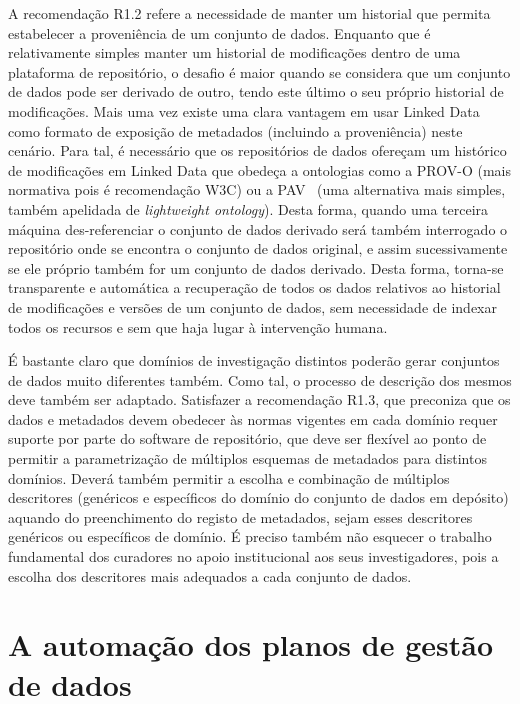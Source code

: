 \documentclass[sigconf,nonacm]{acmart}
\begin{document}
A recomendação R1.2 refere a necessidade de manter um historial que permita estabelecer a proveniência de um conjunto de dados. Enquanto que é relativamente simples manter um historial de modificações dentro de uma plataforma de repositório, o desafio é maior quando se considera que um conjunto de dados pode ser derivado de outro, tendo este último o seu próprio historial de modificações. Mais uma vez existe uma clara vantagem em usar Linked Data como formato de exposição de metadados (incluindo a proveniência) neste cenário. Para tal, é necessário que os repositórios de dados ofereçam um histórico de modificações em Linked Data que obedeça a ontologias como a PROV-O\cite{lebo2013prov} (mais normativa pois é recomendação W3C) ou a PAV~\cite{ciccarese2013pav} (uma alternativa mais simples, também apelidada de \emph{lightweight ontology}). Desta forma, quando uma terceira máquina des-referenciar o conjunto de dados derivado será também interrogado o repositório onde se encontra o conjunto de dados original, e assim sucessivamente se ele próprio também for um conjunto de dados derivado. Desta forma, torna-se transparente e automática a recuperação de todos os dados relativos ao historial de modificações e versões de um conjunto de dados, sem necessidade de indexar todos os recursos e sem que haja lugar à intervenção humana.

É bastante claro que domínios de investigação distintos poderão gerar conjuntos de dados muito diferentes também. Como tal, o processo de descrição dos mesmos deve também ser adaptado. Satisfazer a recomendação R1.3, que preconiza que os dados e metadados devem obedecer às normas vigentes em cada domínio requer suporte por parte do software de repositório, que deve ser flexível ao ponto de permitir a parametrização de múltiplos esquemas de metadados para distintos domínios. Deverá também permitir a escolha e combinação de múltiplos descritores (genéricos e específicos do domínio do conjunto de dados em depósito) aquando do preenchimento do registo de metadados, sejam esses descritores genéricos ou específicos de domínio. É preciso também não esquecer o trabalho fundamental dos curadores no apoio institucional aos seus investigadores, pois a escolha dos descritores mais adequados a cada conjunto de dados.


\section{A automação dos planos de gestão de dados} %
\label{sec:a_automacao_dos_planos_de_gestao_de_dados}
\end{document}
